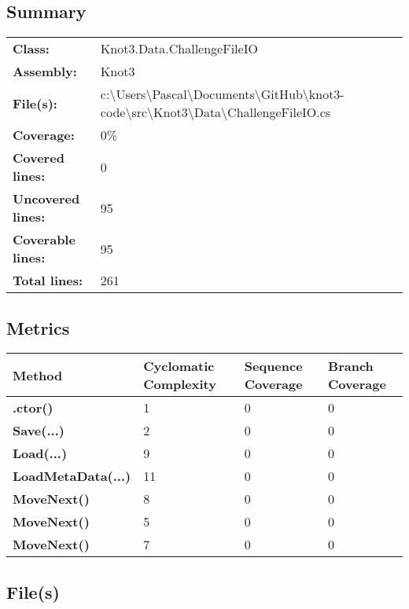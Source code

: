 \documentclass[a4paper,10pt]{article}
\begin{document}
\subsection{Summary}
\begin{longtable}[l]{ll}
\textbf{Class:} & Knot3.Data.ChallengeFileIO\\
\textbf{Assembly:} & Knot3\\
\textbf{File(s):} & \begin{minipage}[t]{12cm}{c:\textbackslash Users\textbackslash Pascal\textbackslash Documents\textbackslash GitHub\textbackslash knot3-code\textbackslash src\textbackslash Knot3\textbackslash Data\textbackslash ChallengeFileIO.cs}\end{minipage} \\
\textbf{Coverage:} & 0\%\\
\textbf{Covered lines:} & 0\\
\textbf{Uncovered lines:} & 95\\
\textbf{Coverable lines:} & 95\\
\textbf{Total lines:} & 261\\
\end{longtable}
\subsection{Metrics}
\begin{longtable}[l]{|l|l|l|l|}
\hline
\textbf{Method} & \textbf{Cyclomatic Complexity} & \textbf{Sequence Coverage} & \textbf{Branch Coverage}\\
\hline
\textbf{.ctor()} & 1 & 0 & 0\\
\hline
\textbf{Save(...)} & 2 & 0 & 0\\
\hline
\textbf{Load(...)} & 9 & 0 & 0\\
\hline
\textbf{LoadMetaData(...)} & 11 & 0 & 0\\
\hline
\textbf{MoveNext()} & 8 & 0 & 0\\
\hline
\textbf{MoveNext()} & 5 & 0 & 0\\
\hline
\textbf{MoveNext()} & 7 & 0 & 0\\
\hline
\end{longtable}
\subsection{File(s)}
\end{document}
